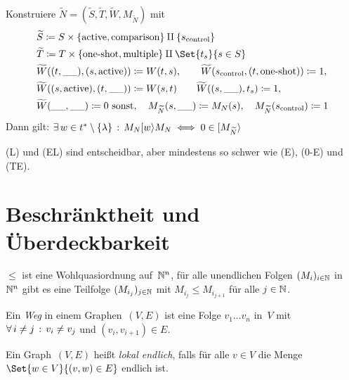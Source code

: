 \documentclass{cheat-sheet}
\newcommand{\activeTransition}[1]{[{#1}\rangle} %
\begin{document}
\begin{beweis}
  Konstruiere $\widetilde{N} = (\widetilde{S}, \widetilde{T}, \widetilde{W}, M_{\widetilde{N}})$ mit
  \begin{align*}
    & \widetilde{S} \coloneqq S \times \{ \text{active}, \text{comparison} \} \amalg \{ s_{\mathrm{control}} \} \\
    & \widetilde{T} \coloneqq T \times \{ \text{one-shot}, \mathrm{multiple} \} \amalg \Set{t_s}{s \in S} \\
    & \widetilde{W}((t, \_\_), (s, \mathrm{active})) \coloneqq W(t, s), \qquad
    \widetilde{W}(s_\text{control}, (t, \text{one-shot})) \coloneqq 1, \\
    & \widetilde{W}((s, \text{active}), (t, \_\_)) \coloneqq W(s, t) \qquad
    \widetilde{W}((s, \_\_), t_s) \coloneqq 1, \\
    & \widetilde{W}(\_\_, \_\_) \coloneqq 0 \text{ sonst}, \quad
    M_{\widetilde{N}}(s, \_\_) \coloneqq M_N(s), \quad
    M_{\widetilde{N}}(s_\mathrm{control}) \coloneqq 1
  \end{align*}
  Dann gilt: \quad
  $\ex{w \in t^* \setminus \{\lambda\}} M_N \activeTransition{w} M_N \iff 0 \in \activeTransition{M_{\widetilde{N}}}$
\end{beweis}

\begin{fazit}
  (L) und (EL) sind entscheidbar, aber mindestens so schwer wie (E), (0-E) und (TE).
\end{fazit}

\section{Beschränktheit und Überdeckbarkeit}

\begin{lem}
  $\leq$ ist eine Wohlquasiordnung auf~$\mathbb{N}^n$, \dh{} für alle unendlichen Folgen $(M_i)_{i \in \mathbb{N}}$ in~$\mathbb{N}^n$ gibt es eine Teilfolge $(M_{i_j})_{j \in \mathbb{N}}$ mit $M_{i_j} \leq M_{i_{j+1}}$ für alle $j \in \mathbb{N}$.
\end{lem}

\begin{defn}
  Ein \emph{Weg} in einem Graphen~$(V, E)$ ist eine Folge $v_1 \ldots v_n$ in~$V$ mit $\forall \, {i \neq j} \,:\, v_i \neq v_j$ und $(v_i, v_{i+1}) \in E$.
\end{defn}

\begin{defn}
  Ein Graph~$(V, E)$ heißt \emph{lokal endlich}, falls für alle $v \in V$ die Menge $\Set{w \in V}{(v, w) \in E}$ endlich ist.
\end{defn}
\end{document}
